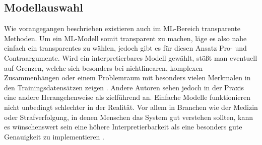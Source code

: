 \subsection{Modellauswahl}
Wie vorangegangen beschrieben existieren auch im ML-Bereich transparente Methoden. Um ein ML-Modell somit transparent zu machen, läge es also nahe einfach ein transparentes zu wählen, jedoch gibt es für diesen Ansatz Pro- und Contraargumente. 
Wird ein interpretierbares Modell gewählt, stößt man eventuell auf Grenzen, welche sich besonders bei nichtlinearen, komplexen Zusammenhängen oder einem Problemraum mit besonders vielen Merkmalen in den Trainingsdatensätzen zeigen \cite{hanif2021survey}.
Andere Autoren sehen jedoch in der Praxis eine andere Herangehenweise als zielführend an. Einfache Modelle funktionieren nicht unbedingt schlechter in der Realität. Vor allem in Branchen wie der Medizin oder Strafverfolgung, in denen Menschen das System gut verstehen sollten, kann es wünschenswert sein eine höhere Interpretierbarkeit als eine besonders gute Genauigkeit zu implementieren \cite{vaughan2020human, keller2020augmenting}.